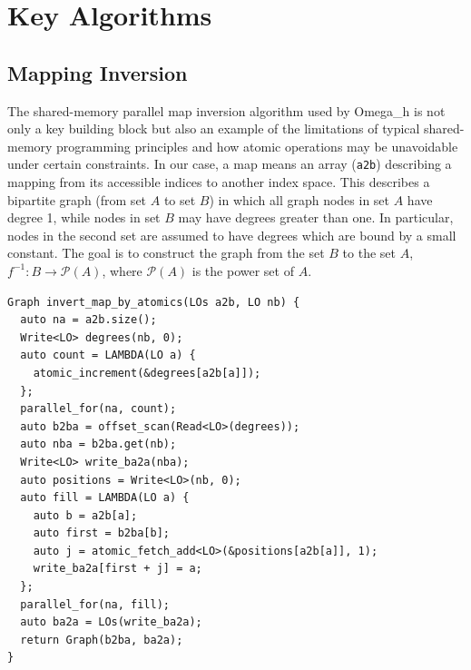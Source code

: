 
\appendix    %

\chapter{Key Algorithms}

\section{Mapping Inversion}
\label{sec:invert_map}

The shared-memory parallel map inversion algorithm used by
Omega\_h is not only a key building block but also an example
of the limitations of typical shared-memory programming principles
and how atomic operations may be unavoidable under certain constraints.
In our case, a map means an array (\texttt{a2b}) describing a mapping from
its accessible indices to another index space.
This describes a bipartite graph (from set $A$ to set $B$) in which all graph nodes
in set $A$ have degree 1, while nodes in set $B$ may
have degrees greater than one.
In particular, nodes in the second set are assumed to have degrees
which are bound by a small constant.
The goal is to construct the graph from the set $B$ to the set $A$,
$f^{-1}:B\to \mathcal{P}(A)$, where $\mathcal{P}(A)$ is the power set of $A$.

\begin{lstlisting}[float,style=dan-style,caption=Invert map by atomics,label=lst:invert_map]
Graph invert_map_by_atomics(LOs a2b, LO nb) {
  auto na = a2b.size();
  Write<LO> degrees(nb, 0);
  auto count = LAMBDA(LO a) {
    atomic_increment(&degrees[a2b[a]]);
  };
  parallel_for(na, count);
  auto b2ba = offset_scan(Read<LO>(degrees));
  auto nba = b2ba.get(nb);
  Write<LO> write_ba2a(nba);
  auto positions = Write<LO>(nb, 0);
  auto fill = LAMBDA(LO a) {
    auto b = a2b[a];
    auto first = b2ba[b];
    auto j = atomic_fetch_add<LO>(&positions[a2b[a]], 1);
    write_ba2a[first + j] = a;
  };
  parallel_for(na, fill);
  auto ba2a = LOs(write_ba2a);
  return Graph(b2ba, ba2a);
}
\end{lstlisting}

